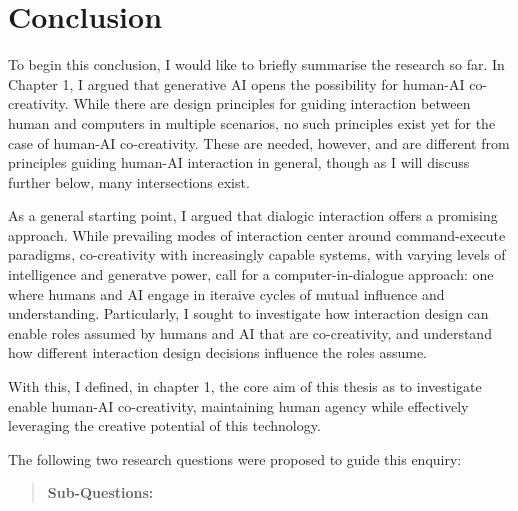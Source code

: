 \chapter[Conclusion]{Conclusion}\label{c:conclusion}

To begin this conclusion, I would like to briefly summarise the research so far. In Chapter 1, I argued that generative AI opens the possibility for human-AI co-creativity. While there are design principles for guiding interaction between human and computers in multiple scenarios, no such principles exist yet for the case of human-AI co-creativity. These are needed, however, and are different from principles guiding human-AI interaction in general, though as I will discuss further below, many intersections exist. 

As a general starting point, I argued that dialogic interaction offers a promising approach. While prevailing modes of interaction center around command-execute paradigms, co-creativity with increasingly capable systems, with varying levels of intelligence and generatve power, call for a computer-in-dialogue approach: one where humans and AI engage in iteraive cycles of mutual influence and understanding. Particularly, I sought to investigate how interaction design can enable roles assumed by humans and AI that are co-creativity, and understand how different interaction design decisions influence the roles assume. 

With this, I defined, in chapter 1, the core aim of this thesis as to investigate enable human-AI co-creativity, maintaining human agency while effectively leveraging the creative potential of this technology.

The following two research questions were proposed to guide this enquiry:

\begin{quote}
\textbf{Sub-Questions:}
\end{quote}

